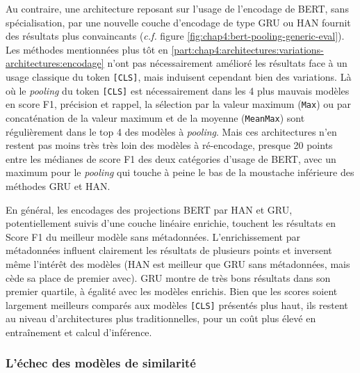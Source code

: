 Au contraire, une architecture reposant sur l'usage de l'encodage de BERT, sans spécialisation, par une nouvelle couche d'encodage de type GRU ou HAN fournit des résultats plus convaincants (\textit{c.f.} figure \ref{fig:chap4:bert-pooling-generic-eval}). Les méthodes mentionnées plus tôt en \ref{part:chap4:architectures:variations-architectures:encodage} n'ont pas nécessairement amélioré les résultats face à un usage classique du token \texttt{[CLS]}, mais induisent cependant bien des variations. Là où le \textit{pooling} du token \texttt{[CLS]} est nécessairement dans les 4 plus mauvais modèles en score F1, précision et rappel, la sélection par la valeur maximum (\texttt{Max}) ou par concaténation de la valeur maximum et de la moyenne (\texttt{MeanMax}) sont régulièrement dans le top 4 des modèles à \textit{pooling}. Mais ces architectures n'en restent pas moins très très loin des modèles à ré-encodage, presque 20 points entre les médianes de score F1 des deux catégories d'usage de BERT, avec un maximum pour le \textit{pooling} qui touche à peine le bas de la moustache inférieure des méthodes GRU et HAN.

En général, les encodages des projections BERT par HAN et GRU, potentiellement suivis d'une couche linéaire enrichie, touchent les résultats en Score F1 du meilleur modèle sans métadonnées. L'enrichissement par métadonnées influent clairement les résultats de plusieurs points et inversent même l'intérêt des modèles (HAN est meilleur que GRU sans métadonnées, mais cède sa place de premier avec). GRU montre de très bons résultats dans son premier quartile, à égalité avec les modèles enrichis. Bien que les scores soient largement meilleurs comparés aux modèles \texttt{[CLS]} présentés plus haut, ils restent au niveau d'architectures plus traditionnelles, pour un coût plus élevé en entraînement et calcul d'inférence.

\subsubsection{L’échec des modèles de similarité}

